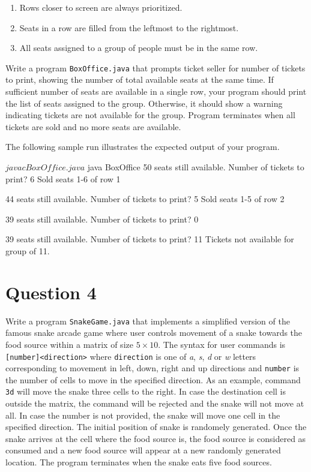 \begin{enumerate}[itemsep=0mm,rightmargin=\leftmargin]
  \item Rows closer to screen are always prioritized.
  \item Seats in a row are filled from the leftmost to the rightmost.
  \item All seats assigned to a group of people must be in the same row.
\end{enumerate}

Write a program \texttt{BoxOffice.java} that prompts ticket seller for number of tickets to print, showing the number of total available seats at the same time.
If sufficient number of seats are available in a single row, your program should print the list of seats assigned to the group.
Otherwise, it should show a warning indicating tickets are not available for the group.
Program terminates when all tickets are sold and no more seats are available.

The following sample run illustrates the expected output of your program.

\begin{terminal}
$ javac BoxOffice.java
$ java BoxOffice
50 seats still available.
Number of tickets to print? 6
Sold seats 1-6 of row 1

44 seats still available.
Number of tickets to print? 5
Sold seats 1-5 of row 2

39 seats still available.
Number of tickets to print? 0

39 seats still available.
Number of tickets to print? 11
Tickets not available for group of 11.
\end{terminal}

\section*{Question 4}

Write a program \texttt{SnakeGame.java} that implements a simplified version of the famous snake arcade game where user controls movement of a snake towards the food source within a matrix of size $5 \times 10$.
The syntax for user commands is \texttt{[number]<direction>} where \texttt{direction} is one of \textit{a}, \textit{s}, \textit{d} or \textit{w} letters corresponding to movement in left, down, right and up directions and \texttt{number} is the number of cells to move in the specified direction. As an example, command \texttt{3d} will move the snake three cells to the right.
In case the destination cell is outside the matrix, the command will be rejected and the snake will not move at all.
In case the number is not provided, the snake will move one cell in the specified direction.
The initial position of snake is randomely generated.
Once the snake arrives at the cell where the food source is, the food source is considered as consumed and a new food source will appear at a new randomly generated location.
The program terminates when the snake eats five food sources.

